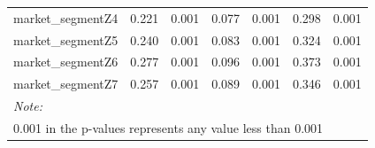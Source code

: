 \documentclass[Royal,times,sageh]{sagej}
\begin{document}
\begin{table}
{\begin{tabular}[t]{lcccccc}
\hspace{1em}market\_segmentZ4 & 0.221 & 0.001 & 0.077 & 0.001 & 0.298 & 0.001\\
\hspace{1em}market\_segmentZ5 & 0.240 & 0.001 & 0.083 & 0.001 & 0.324 & 0.001\\
\hspace{1em}market\_segmentZ6 & 0.277 & 0.001 & 0.096 & 0.001 & 0.373 & 0.001\\
\hspace{1em}market\_segmentZ7 & 0.257 & 0.001 & 0.089 & 0.001 & 0.346 & 0.001\\
\bottomrule
\multicolumn{7}{l}{\rule{0pt}{1em}\textit{Note: }}\\
\multicolumn{7}{l}{\rule{0pt}{1em}0.001 in the p-values represents any value less than 0.001}\\
\end{tabular}}
\end{table}
\end{document}
